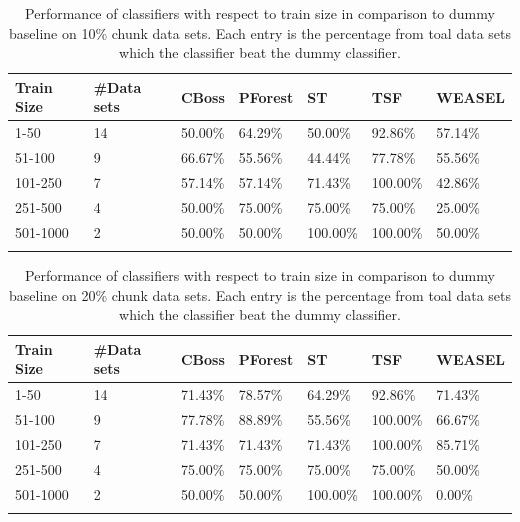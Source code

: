 \begin{table}[hp!]
	\setlength\extrarowheight{2pt} %
	\begin{tabularx}{\textwidth}{|X|X|X|X|X|X|X|}
	\hline
	\textbf{Train Size} & \textbf{\#Data sets} & \textbf{CBoss} & \textbf{PForest} & \textbf{ST} & \textbf{TSF} & \textbf{WEASEL} \\ \hline
		1-50 & 14 & 50.00\% & 64.29\% & 50.00\% & 92.86\% & 57.14\% \\ \hline
		51-100 & 9 & 66.67\% & 55.56\% & 44.44\% & 77.78\% & 55.56\% \\ \hline
		101-250 & 7 & 57.14\% & 57.14\% & 71.43\% & 100.00\% & 42.86\% \\ \hline
		251-500 & 4 & 50.00\% & 75.00\% & 75.00\% & 75.00\% & 25.00\% \\ \hline
		501-1000 & 2 &50.00\% & 50.00\% & 100.00\% & 100.00\% & 50.00\% \\ \hline
	\caption{Performance of classifiers with respect to train size in comparison to dummy baseline on 10\% chunk data sets. Each entry is the percentage from toal data sets which the classifier beat the dummy classifier.}
	\label{TableSize10}
  \end{tabularx}
\end{table}

\begin{table}[hp!]
	\setlength\extrarowheight{2pt} %
	\begin{tabularx}{\textwidth}{|X|X|X|X|X|X|X|}
	\hline
	\textbf{Train Size} & \textbf{\#Data sets} & \textbf{CBoss} & \textbf{PForest} & \textbf{ST} & \textbf{TSF} & \textbf{WEASEL} \\ \hline
		1-50 & 14 & 71.43\% & 78.57\% & 64.29\% & 92.86\% & 71.43\% \\ \hline
		51-100 & 9 & 77.78\% & 88.89\% & 55.56\% & 100.00\% & 66.67\% \\ \hline
		101-250 & 7 & 71.43\% & 71.43\% & 71.43\% & 100.00\% & 85.71\% \\ \hline
		251-500 & 4 & 75.00\% & 75.00\% & 75.00\% & 75.00\% & 50.00\% \\ \hline
		501-1000 & 2 &50.00\% & 50.00\% & 100.00\% & 100.00\% & 0.00\% \\ \hline
	\caption{Performance of classifiers with respect to train size in comparison to dummy baseline on 20\% chunk data sets. Each entry is the percentage from toal data sets which the classifier beat the dummy classifier.}
	\label{TableSize20}
  \end{tabularx}
\end{table}

